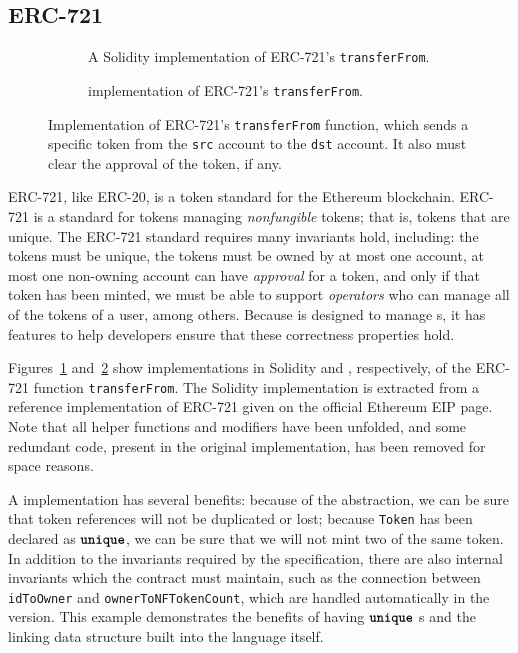 \documentclass[dvipsnames, usenames, sigconf]{acmart}
\begin{document}
\subsection{ERC-721}\label{sec:erc721-impl}
\begin{figure*}
    \centering
    \begin{subfigure}[t]{0.49\textwidth}
        \centering
        
        \caption{A Solidity implementation of ERC-721's \lstinline{transferFrom}.}
        \label{fig:erc721-impl-sol}
    \end{subfigure}%
    \hfill
    \begin{subfigure}[t]{0.49\textwidth}
        \centering
        
        \caption{\langName implementation of ERC-721's \lstinline{transferFrom}.}
        \label{fig:erc721-impl-flow}
    \end{subfigure}
    \caption{Implementation of ERC-721's \lstinline{transferFrom} function, which sends a specific token from the \lstinline{src} account to the \lstinline{dst} account.
        It also must clear the approval of the token, if any.}
    \label{fig:erc721-impl}
\end{figure*}

ERC-721, like ERC-20, is a token standard for the Ethereum blockchain.
ERC-721 is a standard for tokens managing \emph{nonfungible} tokens; that is, tokens that are unique.
The ERC-721 standard requires many invariants hold, including:
    the tokens must be unique,
    the tokens must be owned by at most one account,
    at most one non-owning account can have \emph{approval} for a token, and only if that token has been minted,
    we must be able to support \emph{operators} who can manage all of the tokens of a user,
    among others.
Because \langName is designed to manage \assetTxt{}s, it has features to help developers ensure that these correctness properties hold.

Figures~\ref{fig:erc721-impl-sol} and~\ref{fig:erc721-impl-flow} show implementations in Solidity and \langName, respectively, of the ERC-721 function \lstinline{transferFrom}.
The Solidity implementation is extracted from a reference implementation of ERC-721 given on the official Ethereum EIP page.
Note that all helper functions and modifiers have been unfolded, and some redundant code, present in the original implementation, has been removed for space reasons.

A \langName implementation has several benefits: because of the \assetTxt abstraction, we can be sure that token references will not be duplicated or lost; because \lstinline{Token} has been declared as $\textbf{\texttt{unique}}$, we can be sure that we will not mint two of the same token.
In addition to the invariants required by the specification, there are also internal invariants which the contract must maintain, such as the connection between \lstinline{idToOwner} and \lstinline{ownerToNFTokenCount}, which are handled automatically in the \langName version.
This example demonstrates the benefits of having $\textbf{\texttt{unique}}$ \assetTxt{}s and the linking data structure built into the language itself.
\end{document}
